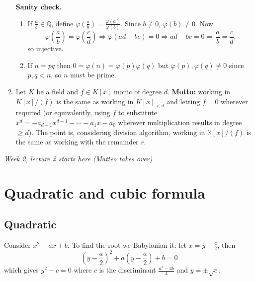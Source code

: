 \documentclass[a4paper]{article}
\newcommand{\Q}{\mathbb Q}
\theoremstyle{definition}
\begin{document}
\begin{enumerate}
\textbf{Sanity check.} \begin{enumerate}
\item If $\frac{a}{b}\in\Q$, define $\varphi\left(\frac{a}{b}\right)=\frac{\varphi (a)}{\varphi(b)}$. Since $b\neq 0$, $\varphi(b)\neq 0$. Now
\[
\varphi\left(\frac{a}{b}\right)=\varphi\left(\frac{c}{d}\right)\Rightarrow\varphi(ad-bc)=0\Rightarrow ad-bc=0\Rightarrow \frac{a}{b}=\frac{c}{d},
\]
so injective.
\item If $n=pq$ then $0=\varphi(n)=\varphi(p)\varphi(q)$ but $\varphi(p),\varphi(q)\neq 0$ since $p,q<n$, so $n$ must be prime.
\end{enumerate}

\item Let $K$ be a field and $f\in K[x]$ monic of degree $d$. \textbf{Motto:} working in $K[x]/(f)$ is the same as working in $K[x]_{<d}$ and letting $f=0$ wherever required (or equivalently, using $f$ to substitute $x^d=-a_{d-1}x^{d-1}-\cdots-a_1x-a_0$ wherever multiplication results in degree $\geq d$). The point is, considering division algorithm, working in $\mathbb K[x]/(f)$ is the same as working with the remainder $r$.
\end{enumerate}

\begin{flushright}
\textit{Week 2, lecture 2 starts here (Matteo takes over)}
\end{flushright}

\section{Quadratic and cubic formula}
\subsection{Quadratic}
Consider $x^2+ax+b$. To find the root we Babylonian it: let $x=y-\frac{a}{2}$, then
\[
\left(y-\frac{a}{2}\right)^2+a\left(y-\frac{a}{2}\right)+b=0
\]
which gives $y^2-c=0$ where $c$ is the discriminant $\frac{a^2-4b}{4}$ and $y=\pm\sqrt c$.
\end{document}
